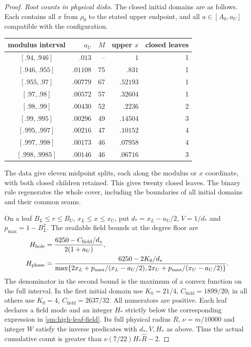 \begin{proof}
\smallskip\noindent\emph{Root counts in physical disks.}
The closed initial domains are as follows. Each contains
all $x$ from $\rho_0$ to the stated upper endpoint, and all
$a\in[A_0,a_U]$ compatible with the configuration.
\begin{center}\small
\begin{tabular}{crrrr}
\toprule
modulus interval&$a_U$&$M$&upper $x$&closed leaves\\\midrule
$[.94,.946]$&$.013$&--&$1$&1\\
$[.946,.955]$&$.01108$&75&$.831$&1\\
$[.955,.97]$&$.00779$&67&$.52193$&1\\
$[.97,.98]$&$.00572$&57&$.32604$&1\\
$[.98,.99]$&$.00430$&52&$.2236$&2\\
$[.99,.995]$&$.00296$&49&$.14504$&3\\
$[.995,.997]$&$.00216$&47&$.10152$&4\\
$[.997,.998]$&$.00173$&46&$.07958$&4\\
$[.998,.9985]$&$.00146$&46&$.06716$&3\\\bottomrule
\end{tabular}
\end{center}
The data give eleven midpoint splits, each along the modulus or
$x$ coordinate, with both closed children retained. This gives
twenty closed leaves. The binary rule regenerates the whole cover,
including the boundaries of all initial domains and their common seams.

On a leaf $B_L\le r\le B_U$, $x_L\le x\le x_U$, put
$d_*=x_L-a_U/2$, $V=1/d_*$ and $p_{\max}=1-B_L^2$.
The available field bounds at the degree floor are
\begin{align}
 H_{\mathrm{hole}}&=\frac{6250-C_{\mathrm{field}}/d_*}{2(1+a_U)},\notag\\
 H_{\mathrm{phase}}&=\frac{6250-2K_0/d_*}
 {\max\{2x_L+p_{\max}/(x_L-a_U/2),
          2x_U+p_{\max}/(x_U-a_U/2)\}}.
 \label{sm:high-leaf-field}
\end{align}
The denominator in the second bound is the maximum of a convex
function on the full interval. In the first initial domain use
$K_0=21/4$, $C_{\mathrm{field}}=1899/20$; in all others use
$K_0=4$, $C_{\mathrm{field}}=2637/32$.
All numerators are positive. Each leaf declares a field mode and an
integer $H_*$ strictly below the corresponding expression in
\eqref{sm:high-leaf-field}.
Its full physical radius $R$, $\nu=m/10000$ and integer $W$
satisfy the inverse predicates with $d_*,V,H_*$ as above.
Thus the actual cumulative count is greater than
$\nu(7/22)H_*\widehat R-2$.


\end{proof}
